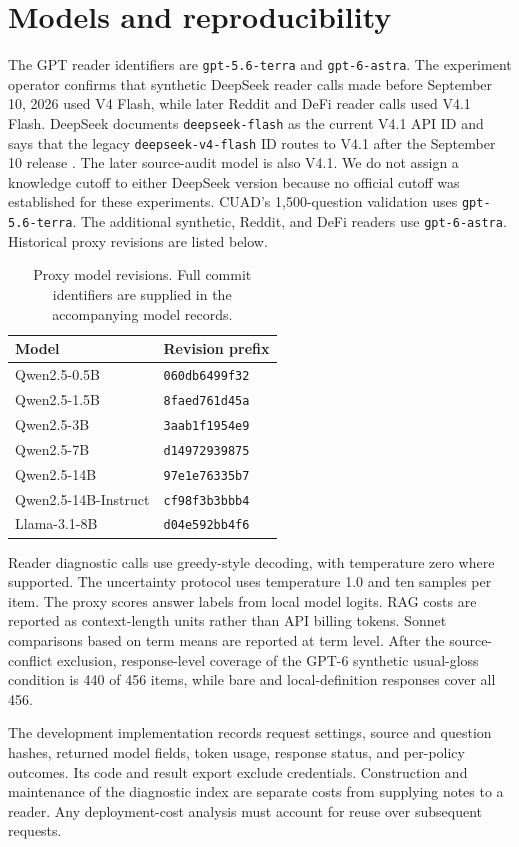 \section{Models and reproducibility}
\label{app:models}
The GPT reader identifiers are \texttt{gpt-5.6-terra} and \texttt{gpt-6-astra}. The experiment operator confirms that synthetic DeepSeek reader calls made before September 10, 2026 used V4 Flash, while later Reddit and DeFi reader calls used V4.1 Flash. DeepSeek documents \texttt{deepseek-flash} as the current V4.1 API ID and says that the legacy \texttt{deepseek-v4-flash} ID routes to V4.1 after the September 10 release \citep{deepseek-v41-release}. The later source-audit model is also V4.1. We do not assign a knowledge cutoff to either DeepSeek version because no official cutoff was established for these experiments. CUAD's 1,500-question validation uses \texttt{gpt-5.6-terra}. The additional synthetic, Reddit, and DeFi readers use \texttt{gpt-6-astra}. Historical proxy revisions are listed below.

\begin{table}[h]
\centering\small
\caption{Proxy model revisions. Full commit identifiers are supplied in the accompanying model records.}
\begin{tabular}{@{}ll@{}}\toprule
Model & Revision prefix\\\midrule
Qwen2.5-0.5B & \texttt{060db6499f32}\\
Qwen2.5-1.5B & \texttt{8faed761d45a}\\
Qwen2.5-3B & \texttt{3aab1f1954e9}\\
Qwen2.5-7B & \texttt{d14972939875}\\
Qwen2.5-14B & \texttt{97e1e76335b7}\\
Qwen2.5-14B-Instruct & \texttt{cf98f3b3bbb4}\\
Llama-3.1-8B & \texttt{d04e592bb4f6}\\\bottomrule
\end{tabular}
\end{table}

Reader diagnostic calls use greedy-style decoding, with temperature zero where supported. The uncertainty protocol uses temperature 1.0 and ten samples per item. The proxy scores answer labels from local model logits. RAG costs are reported as context-length units rather than API billing tokens. Sonnet comparisons based on term means are reported at term level. After the source-conflict exclusion, response-level coverage of the GPT-6 synthetic usual-gloss condition is 440 of 456 items, while bare and local-definition responses cover all 456.

The development implementation records request settings, source and question hashes, returned model fields, token usage, response status, and per-policy outcomes. Its code and result export exclude credentials. Construction and maintenance of the diagnostic index are separate costs from supplying notes to a reader. Any deployment-cost analysis must account for reuse over subsequent requests.

